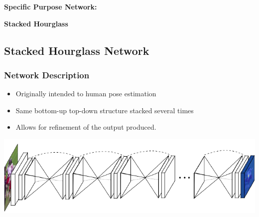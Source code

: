\documentclass{beamer}
\begin{document}
\begin{frame}
\huge{\centerline{\textbf{Specific Purpose Network:}}}
\huge{\centerline{\textbf{Stacked Hourglass}}}
\end{frame}

\subsection{Stacked Hourglass Network}





\begin{frame}
\frametitle{Network Description}

\begin{itemize}
\item Originally intended to human pose estimation
\item Same bottom-up top-down structure stacked several times
\item Allows for refinement of the output produced.
\end{itemize}
\begin{center}
\includegraphics[scale=0.5]{stacked.png}
\end{center}

\end{frame}

\end{document}
